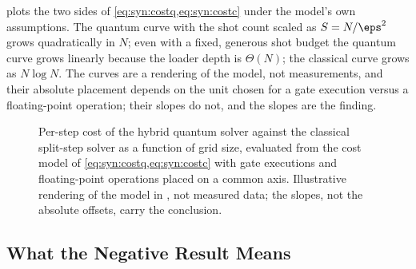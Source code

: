  plots the two sides of \cref{eq:syn:costq,eq:syn:costc} under the model's own assumptions. The quantum curve with the shot count scaled as $S=N/\eps^{2}$ grows quadratically in $N$; even with a fixed, generous shot budget the quantum curve grows linearly because the loader depth is $\Theta(N)$; the classical curve grows as $N\log N$. The curves are a rendering of the model, not measurements, and their absolute placement depends on the unit chosen for a gate execution versus a floating-point operation; their slopes do not, and the slopes are the finding.

\begin{figure}[htbp]
\centering
{}
\caption{Per-step cost of the hybrid quantum solver against the classical split-step solver as a function of grid size, evaluated from the cost model of \cref{eq:syn:costq,eq:syn:costc} with gate executions and floating-point operations placed on a common axis. Illustrative rendering of the model in \cite{guo2026nonlinearwaves}, not measured data; the slopes, not the absolute offsets, carry the conclusion.}
\label{fig:syn:cost}
\end{figure}

\subsection{What the Negative Result Means}\label{sec:syn:waves-meaning}

